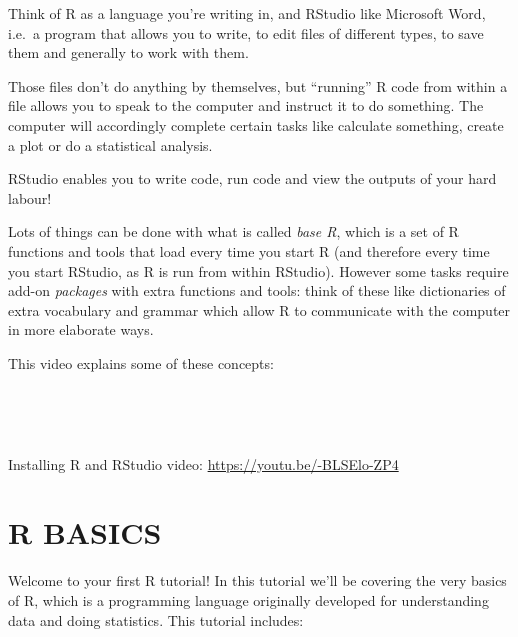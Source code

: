 \documentclass[
]{book}
\begin{document}
Think of R as a language you're writing in, and
RStudio like Microsoft Word, i.e.~a program that allows you to write,
to edit files of different types, to save them and generally to work with them.

Those files don't do anything by themselves, but ``running'' R code from within a file allows you
to speak to the computer and instruct it to do something. The computer will accordingly
complete certain tasks like calculate something, create a plot or do a statistical
analysis.

RStudio enables you to write code, run code and view the outputs of
your hard labour!

Lots of things can be done with what is called \emph{base R},
which is a set of R functions and tools that load every time you start R
(and therefore every time you start RStudio, as R is run from within RStudio).
However some tasks require add-on \emph{packages} with
extra functions and tools: think of these like dictionaries of extra vocabulary and grammar
which allow R to communicate with the computer in more elaborate ways.

This video explains some of these concepts:\\
\hspace*{0.333em}

~

~

Installing R and RStudio video: \url{https://youtu.be/-BLSElo-ZP4}
~

\hypertarget{r-basics}{%
\chapter{R BASICS}\label{r-basics}}

Welcome to your first R tutorial! In this tutorial we'll be covering the very basics of R, which is a programming language originally developed for
understanding data and doing statistics. This tutorial includes:
\end{document}
